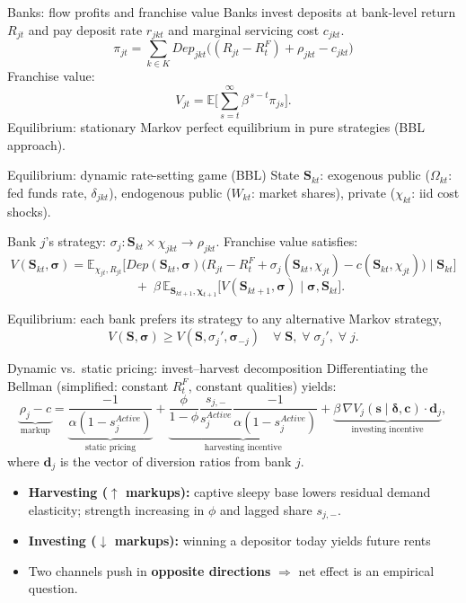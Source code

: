 \documentclass[10pt,aspectratio=169]{beamer}
\begin{document}
\begin{frame}{Banks: flow profits and franchise value}
Banks invest deposits at bank-level return $R_{jt}$ and pay deposit rate $r_{jkt}$ and marginal servicing cost $c_{jkt}$.
\[
\pi_{jt}=\sum_{k\in K} Dep_{jkt}\Big((R_{jt}-R_t^F)+\rho_{jkt}-c_{jkt}\Big)\]
Franchise value:
\[
V_{jt}=\mathbb{E}\Big[\sum_{s=t}^{\infty}\beta^{\,s-t}\pi_{js}\Big].
\]
Equilibrium: stationary Markov perfect equilibrium in pure strategies (BBL approach).
\end{frame}

\begin{frame}{Equilibrium: dynamic rate-setting game (BBL)}
State $\mathbf{S}_{kt}$: exogenous public ($\Omega_{kt}$: fed funds rate, $\delta_{jkt}$), endogenous public ($W_{kt}$: market shares), private ($\chi_{kt}$: iid cost shocks).

\smallskip
Bank $j$'s strategy: $\sigma_j: \mathbf{S}_{kt}\times \chi_{jkt}\to \rho_{jkt}$. Franchise value satisfies:
\[
V(\mathbf{S}_{kt},\boldsymbol{\sigma})
= \mathbb{E}_{\chi_{jt},R_{jt}}\Big[
Dep(\mathbf{S}_{kt},\boldsymbol{\sigma})\big(R_{jt}-R_t^F + \sigma_j(\mathbf{S}_{kt},\chi_{jt}) - c(\mathbf{S}_{kt},\chi_{jt})\big)
\;\Big|\;\mathbf{S}_{kt}\Big]
\]
\[
\quad + \;\beta\,\mathbb{E}_{\mathbf{S}_{kt+1},\boldsymbol{\chi}_{t+1}}\Big[
V(\mathbf{S}_{kt+1},\boldsymbol{\sigma})\;\Big|\;\boldsymbol{\sigma},\mathbf{S}_{kt}
\Big]. \tag{5}
\]

Equilibrium: each bank prefers its strategy to any alternative Markov strategy,
\[
V(\mathbf{S},\boldsymbol{\sigma}) \geq V(\mathbf{S},\sigma_j',\boldsymbol{\sigma}_{-j})
\quad \forall\;\mathbf{S},\;\forall\;\sigma_j',\;\forall\;j.
\]
\end{frame}

\begin{frame}{Dynamic vs.\ static pricing: invest--harvest decomposition}
Differentiating the Bellman (simplified: constant $R_t^F$, constant qualities) yields:
\[
\underbrace{\rho_j - c}_{\text{markup}}
= \underbrace{\frac{-1}{\alpha(1-s_j^{Active})}}_{\text{static pricing}}
+ \underbrace{\frac{\phi}{1-\phi}\frac{s_{j,-}}{s_j^{Active}}\frac{-1}{\alpha(1-s_j^{Active})}}_{\text{harvesting incentive}}
+ \underbrace{\beta\,\nabla V_j(\mathbf{s}\mid\boldsymbol{\delta},\mathbf{c})\cdot\mathbf{d}_j}_{\text{investing incentive}}, \tag{6}
\]
where $\mathbf{d}_j$ is the vector of diversion ratios from bank $j$.
\begin{itemize}
	\item \textbf{Harvesting ($\uparrow$ markups):} captive sleepy base lowers residual demand elasticity; strength increasing in $\phi$ and lagged share $s_{j,-}$.
	\item \textbf{Investing ($\downarrow$ markups):} winning a depositor today yields future rents
	\item Two channels push in \textbf{opposite directions} $\Rightarrow$ net effect is an empirical question.
\end{itemize}
\end{frame}
\end{document}
